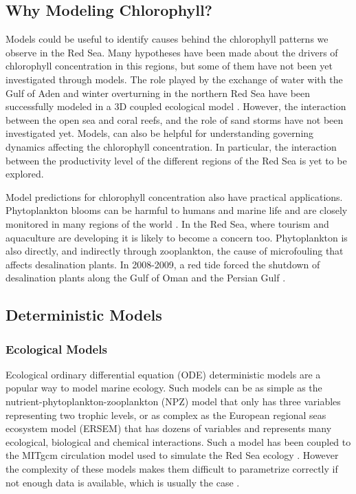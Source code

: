 \subsection{Why Modeling Chlorophyll?}

Models could be useful to identify causes behind the chlorophyll patterns we observe in the Red Sea. Many hypotheses have been made about the drivers of chlorophyll concentration in this regions, but some of them have not been yet investigated through models. The role played by the exchange of water with the Gulf of Aden and winter overturning in the northern Red Sea have been successfully modeled in a 3D coupled ecological model \cite{Triantafyllou2014}. However, the interaction between the open sea and coral reefs, and the role of sand storms have not been investigated yet. Models, can also be helpful for understanding governing dynamics affecting the chlorophyll concentration. In particular, the interaction between the productivity level of the different regions of the Red Sea is yet to be explored.

Model predictions for chlorophyll concentration also have practical applications. Phytoplankton blooms can be harmful to humans and marine life and are closely monitored in many regions of the world \cite{Pettersson2013}. In the Red Sea, where tourism and aquaculture are developing it is likely to become a concern too. Phytoplankton is also directly, and indirectly through zooplankton, the cause of microfouling that affects desalination plants. In 2008-2009, a red tide forced the shutdown of desalination plants along the Gulf of Oman and the Persian Gulf \cite{Richlen2010}.


\subsection{Deterministic Models}

\subsubsection{Ecological Models}

Ecological ordinary differential equation (ODE) deterministic models are a popular way to model marine ecology. Such models can be as simple as the nutrient-phytoplankton-zooplankton (NPZ) model that only has three variables representing two trophic levels, or as complex as the European regional seas ecosystem model (ERSEM) that has dozens of variables and represents many ecological, biological and chemical interactions. Such a model has been coupled to the MITgcm circulation model used to simulate the Red Sea ecology \cite{Triantafyllou2014}. However the complexity of these models makes them difficult to parametrize correctly if not enough data is available, which is usually the case \cite{Anderson2005}.

